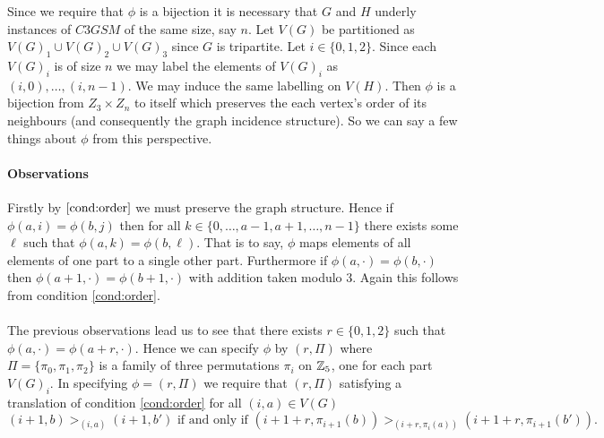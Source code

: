  \begin{note}\label{note:labels}
 Since we require that $\phi$ is a bijection it is necessary that $G$ and $H$ underly instances of $C3GSM$ of the same size, say $n$. Let $V(G)$ be partitioned as $V(G)_1 \cup V(G)_2 \cup V(G)_3$ since $G$ is tripartite. Let $i \in \{0,1,2\}$. Since each $V(G)_i$ is of size $n$ we may label the elements of $V(G)_i$ as $(i,0), \dots, (i,n-1)$. We may induce the same labelling on $V(H)$. Then $\phi$ is a bijection from $Z_3 \times Z_n$ to itself which preserves the each vertex's order of its neighbours (and consequently the graph incidence structure). So we can say a few things about $\phi$ from this perspective.
 \end{note}
 \paragraph{Observations} Firstly by $\ref{cond:order}$ we must preserve the graph structure. Hence if $\phi(a,i) = \phi(b, j)$ then for all $k \in \{0,\dots,a-1,a+1,\dots,n-1\}$ there exists some $\ell$ such that $\phi(a,k) = \phi(b,\ell)$. That is to say, $\phi$ maps elements of all elements of one part to a single other part. Furthermore if $\phi(a,\cdot) = \phi(b,\cdot)$ then $\phi(a+1,\cdot) = \phi(b+1, \cdot)$ with addition taken modulo $3$. Again this follows from condition \ref{cond:order}.
\paragraph{}
The previous observations lead us to see that there exists $r \in \{0,1,2\}$ such that $\phi(a, \cdot) = \phi(a+r,\cdot)$. Hence we can specify $\phi$ by $(r,\Pi)$ where $\Pi = \{\pi_0, \pi_1,\pi_2\}$ is a family of three permutations $\pi_i$ on $\mathbb{Z}_5$, one for each part $V(G)_i$. In specifying $\phi=(r,\Pi)$ we require that $(r,\Pi)$ satisfying a translation of condition \ref{cond:order} for all $(i,a) \in V(G)$
\begin{equation}\label{cond:orderT}
(i+1,b) >_{(i,a)} (i+1, b') \text{ if and only if } (i+1+r, \pi_{i+1}(b)) >_{(i+r,\pi_i(a))} (i+1+r, \pi_{i+1}(b')).
\end{equation}
